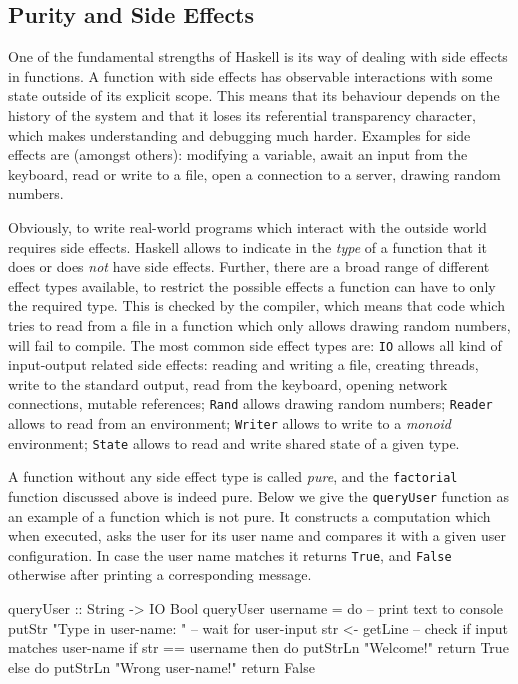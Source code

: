 \subsection{Purity and Side Effects}
\label{sec:purity_sideeffects}
One of the fundamental strengths of Haskell is its way of dealing with side effects in functions. A function with side effects has observable interactions with some state outside of its explicit scope. This means that its behaviour depends on the history of the system and that it loses its referential transparency character, which makes understanding and debugging much harder. Examples for side effects are (amongst others): modifying a variable, await an input from the keyboard, read or write to a file, open a connection to a server, drawing random numbers.

Obviously, to write real-world programs which interact with the outside world requires side effects. Haskell allows to indicate in the \textit{type} of a function that it does or does \textit{not} have side effects. Further, there are a broad range of different effect types available, to restrict the possible effects a function can have to only the required type. This is checked by the compiler, which means that code which tries to read from a file in a function which only allows drawing random numbers, will fail to compile. The most common side effect types are: \texttt{IO} allows all kind of input-output related side effects: reading and writing a file, creating threads, write to the standard output, read from the keyboard, opening network connections, mutable references; \texttt{Rand} allows drawing random numbers; \texttt{Reader} allows to read from an environment; \texttt{Writer} allows to write to a \textit{monoid} environment; \texttt{State} allows to read and write shared state of a given type.

A function without any side effect type is called \textit{pure}, and the \texttt{factorial} function discussed above is indeed pure. Below we give the \texttt{queryUser} function as an example of a function which is not pure. It constructs a computation which when executed, asks the user for its user name and compares it with a given user configuration. In case the user name matches it returns \texttt{True}, and \texttt{False} otherwise after printing a corresponding message. 

\begin{HaskellCode}
queryUser :: String -> IO Bool
queryUser username = do
  -- print text to console
  putStr "Type in user-name: "
  -- wait for user-input
  str <- getLine
  -- check if input matches user-name
  if str == username
    then do
      putStrLn "Welcome!"			
      return True
    else do
      putStrLn "Wrong user-name!"
      return False
\end{HaskellCode}


